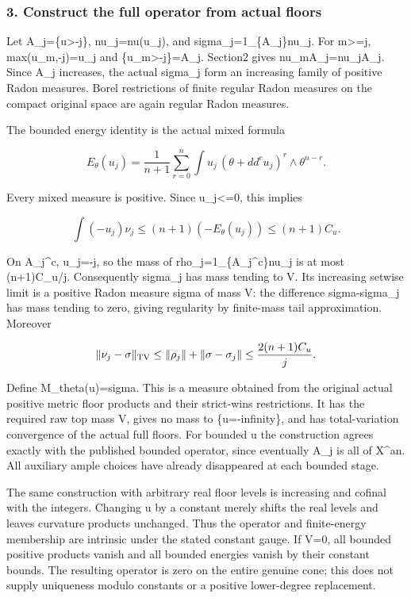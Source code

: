 \documentclass[
]{article}
\begin{document}
\subsubsection{3. Construct the full operator from actual
floors}\label{construct-the-full-operator-from-actual-floors}

Let A\_j=\{u\textgreater-j\}, nu\_j=nu(u\_j), and
sigma\_j=1\_\{A\_j\}nu\_j. For m\textgreater=j, max(u\_m,-j)=u\_j and
\{u\_m\textgreater-j\}=A\_j. Section2 gives
nu\_m\textbar A\_j=nu\_j\textbar A\_j. Since A\_j increases, the actual
sigma\_j form an increasing family of positive Radon measures. Borel
restrictions of finite regular Radon measures on the compact original
space are again regular Radon measures.

The bounded energy identity is the actual mixed formula

\[E_\theta(u_j)=\frac1{n+1}\sum_{r=0}^n
\int u_j\,(\theta+dd^cu_j)^r\wedge\theta^{n-r}.\]

Every mixed measure is positive. Since u\_j\textless=0, this implies

\[\int(-u_j)\nu_j\leq(n+1)(-E_\theta(u_j))\leq(n+1)C_u.\]

On A\_j\^{}c, u\_j=-j, so the mass of rho\_j=1\_\{A\_j\^{}c\}nu\_j is at
most (n+1)C\_u/j. Consequently sigma\_j has mass tending to V. Its
increasing setwise limit is a positive Radon measure sigma of mass V:
the difference sigma-sigma\_j has mass tending to zero, giving
regularity by finite-mass tail approximation. Moreover

\[\|\nu_j-\sigma\|_{\rm TV}\leq
\|\rho_j\|+\|\sigma-\sigma_j\|
\leq\frac{2(n+1)C_u}{j}.\]

Define M\_theta(u)=sigma. This is a measure obtained from the original
actual positive metric floor products and their strict-wins
restrictions. It has the required raw top mass V, gives no mass to
\{u=-infinity\}, and has total-variation convergence of the actual full
floors. For bounded u the construction agrees exactly with the published
bounded operator, since eventually A\_j is all of X\^{}an. All auxiliary
ample choices have already disappeared at each bounded stage.

The same construction with arbitrary real floor levels is increasing and
cofinal with the integers. Changing u by a constant merely shifts the
real levels and leaves curvature products unchanged. Thus the operator
and finite-energy membership are intrinsic under the stated constant
gauge. If V=0, all bounded positive products vanish and all bounded
energies vanish by their constant bounds. The resulting operator is zero
on the entire genuine cone; this does not supply uniqueness modulo
constants or a positive lower-degree replacement.
\end{document}
